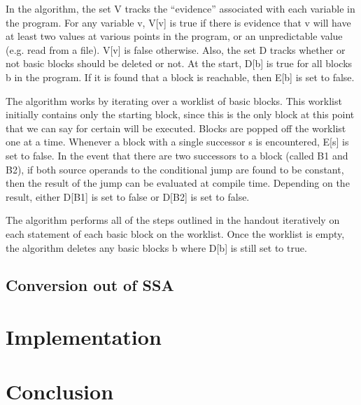 \documentclass[a4paper,10pt]{report}
\begin{document}
In the algorithm, the set V tracks the ``evidence'' associated with each variable in the program. For any variable v,
V[v] is true if there is evidence that v will have at least two values at various points in the program, or an unpredictable
value (e.g. read from a file). V[v] is false otherwise. Also, the set D tracks whether or not basic blocks should be deleted or 
not. At the start, D[b] is true for all blocks b in the program. If it is found that a block is reachable, then E[b] is set to false.

The algorithm works by iterating over a worklist of basic blocks. This worklist initially contains only the starting block,
since this is the only block at this point that we can say for certain will be executed. Blocks are popped off the worklist
one at a time. Whenever a block with a single successor s is encountered, E[s] is set to false. In the event that there are two
successors to a block (called B1 and B2), if both source operands to the conditional jump are found to be constant, then the result 
of the jump can be evaluated at compile time. Depending on the result, either D[B1] is set to false or D[B2] is set to false.

The algorithm performs all of the steps outlined in the handout iteratively on each statement of each basic block on the worklist.
Once the worklist is empty, the algorithm deletes any basic blocks b where D[b] is still set to true.

\section{Conversion out of SSA}


\chapter{Implementation}


\chapter{Conclusion}
\end{document}
